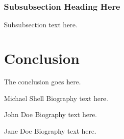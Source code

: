 \documentclass[10pt,journal,compsoc]{IEEEtran}
\begin{document}
\subsubsection{Subsubsection Heading Here}
Subsubsection text here.

\section{Conclusion}
The conclusion goes here.




\begin{IEEEbiography}{Michael Shell}
Biography text here.
\end{IEEEbiography}

\begin{IEEEbiographynophoto}{John Doe}
Biography text here.
\end{IEEEbiographynophoto}

\begin{IEEEbiographynophoto}{Jane Doe}
Biography text here.
\end{IEEEbiographynophoto}
\end{document}
